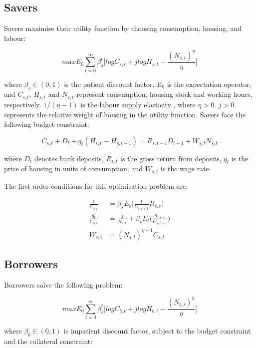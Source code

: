 \documentclass[final,3p,times,twocolumn]{elsarticle}
\begin{document}

 \subsection{Savers}

Savers maximise their utility function by choosing consumption, housing, and labour:

$$max \displaystyle E_0 \sum_{t=0}^{\infty}\beta_s^t \Bigg[ log C_{s,t} + j log H_{s,t} - \frac{(N_{s,t})^\eta}{\eta} \Bigg] $$

where $\beta_s \in (0,1)$ is the patient discount factor, $E_0$ is the expectation operator, and $C_{s,t}$, $H_{s,t}$ and $N_{s,t}$ represent consumption, housing stock and working hours, respectively. $1/(\eta-1)$ is the labour supply elasticity , where $\eta>0$. $j>0$ represents the relative weight of housing in the utility function. Savers face the following budget constraint:

\begin{equation}
C_{s,t} + D_t + q_t(H_{s,t} - H_{s,t-1}) = R_{s, t-1}D_{t-1} + W_{s,t}N_{s,t}
\end{equation}

where $D_t$ denotes bank deposits, $R_{s,t}$ is the gross return from deposits, $q_t$ is the price of housing in units of consumption, and $W_{s,t}$ is the wage rate. 

The first order conditions for this optimisation problem are:

\begin{align}
  \frac{1}{C_{s,t}}  &= \beta_s E_t\Bigg( \frac{1}{C_{s,t+1}}R_{s,t} \Bigg) \\
  \frac{q_t}{C_{s,t}}  &= \frac{j}{H_{s,t}} + \beta_s E_t \Bigg( \frac{q_{t+1}}{C_{s,t+1}} \Bigg)  \\
   W_{s,t}  &= (N_{s,t})^{\eta-1} C_{s,t} 
\end{align}

 \subsection{Borrowers}

Borrowers solve the following problem:

$$max \displaystyle E_0 \sum_{t=0}^{\infty}\beta_b^t \Bigg[ log C_{b,t} + j log H_{b,t} - \frac{(N_{b,t})^\eta}{\eta} \Bigg] $$

where $\beta_b \in (0,1)$ is impatient discount factor, subject to the budget constraint and the collateral constraint: 
\end{document}
